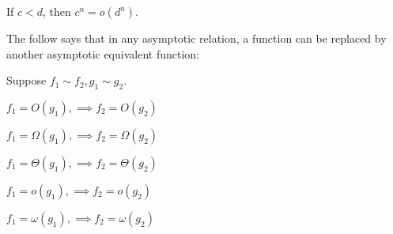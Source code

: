 \begin{prop}
  If $c < d$, then $c^n = o(d^n)$.
\end{prop}

The follow says that in any asymptotic relation, a function can be
replaced by another asymptotic equivalent function:

\begin{prop}
  Suppose $f_1 \sim f_2, g_1 \sim g_2$.
  \begin{myenum}
  \item $f_1 = O(g_1),  \implies f_2 = O(g_2)$
  \item $f_1 = \Omega(g_1),  \implies f_2 = \Omega(g_2)$
  \item $f_1 = \Theta(g_1),  \implies f_2 = \Theta(g_2)$
  \item $f_1 = o(g_1),  \implies f_2 = o(g_2)$
  \item $f_1 = \omega(g_1),  \implies f_2 = \omega(g_2)$
  \end{myenum}
\end{prop}

%
